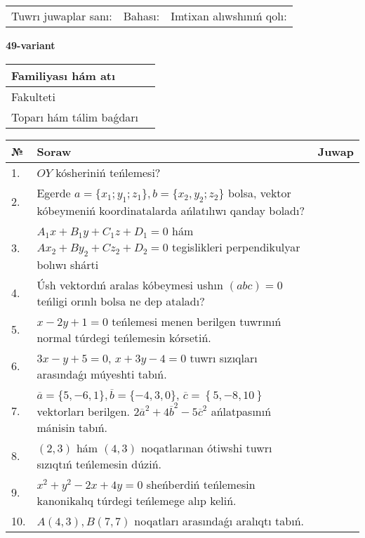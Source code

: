 \documentclass{article}
\begin{document}
\vspace{1cm}

\begin{tabular}{lll}
Tuwrı juwaplar sanı: \underline{\hspace{1.5cm}} & 
Bahası: \underline{\hspace{1.5cm}} & 
Imtixan alıwshınıń qolı: \underline{\hspace{2cm}} \\
\end{tabular}

\egroup

\newpage


\textbf{49-variant}\\

\bgroup
\def\arraystretch{1.6} %

\begin{tabular}{|m{5.7cm}|m{9.5cm}|}
\hline
Familiyası hám atı & \\
\hline
Fakulteti  & \\
\hline
Toparı hám tálim baǵdarı  & \\
\hline
\end{tabular}

\vspace{1cm}

\begin{tabular}{|m{0.7cm}|m{10cm}|m{4cm}|}
\hline
№ & Soraw & Juwap \\
\hline
1. & $OY$ kósheriniń teńlemesi? &  \\
\hline
2. & Egerde $a=\{ x_1; y_1; z_1\}, b=\{ x_2, y_2; z_2\}$ bolsa, vektor kóbeymeniń koordinatalarda ańlatılıwı qanday boladı? &  \\
\hline
3. & $A_1x+B_1y+C_1z+D_1=0$ hám $Ax_2+By_2+Cz_2+D_2=0$ tegislikleri perpendikulyar bolıwı shárti &  \\
\hline
4. & Úsh vektordıń aralas kóbeymesi ushın $(abc)=0$ teńligi orınlı bolsa ne dep ataladı? &  \\
\hline
5. & $x-2y+1=0$ teńlemesi menen berilgen tuwrınıń normal túrdegi teńlemesin kórsetiń. &  \\
\hline
6. & $3x-y+5=0$, $x+3y-4=0$ tuwrı sızıqları arasındaǵı múyeshti tabıń. &  \\
\hline
7. & $\overline{a}=\{5,-6, 1 \}, \overline{b}=\{-4, 3, 0 \} $, $\overline{c}=\left\{ 5,-8, 10 \right\}$ vektorları berilgen. $2{\overline{a}}^{2}+4{\overline{b}}^{2}-5{\overline{c}}^{2}$ ańlatpasınıń mánisin tabıń. &  \\
\hline
8. & $(2, 3)$ hám $(4, 3)$ noqatlarınan ótiwshi tuwrı sızıqtıń teńlemesin dúziń. &  \\
\hline
9. & $x^{2}+y^{2}-2x+4y=0$ sheńberdiń teńlemesin kanonikalıq túrdegi teńlemege alıp keliń. &  \\
\hline
10. & $A(4, 3), B(7, 7)$ noqatları arasındaǵı aralıqtı tabıń. &  \\
\hline
\end{tabular}
\end{document}
